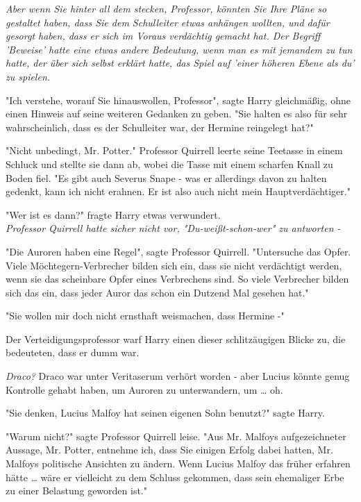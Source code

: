{\emph{Aber wenn Sie hinter all dem stecken, Professor, könnten Sie Ihre Pläne so gestaltet haben, dass Sie dem Schulleiter etwas anhängen wollten, und dafür gesorgt haben, dass er sich im Voraus verdächtig gemacht hat. Der Begriff 'Beweise' hatte eine etwas andere Bedeutung, wenn man es mit jemandem zu tun hatte, der über sich selbst erklärt hatte, das Spiel auf 'einer höheren Ebene als du' zu spielen.}

"Ich verstehe, worauf Sie hinauswollen, Professor", sagte Harry gleichmäßig, ohne einen Hinweis auf seine weiteren Gedanken zu geben. "Sie halten es also für sehr wahrscheinlich, dass es der Schulleiter war, der Hermine reingelegt hat?"

"Nicht unbedingt, Mr. Potter." Professor Quirrell leerte seine Teetasse in einem Schluck und stellte sie dann ab, wobei die Tasse mit einem scharfen Knall zu Boden fiel. "Es gibt auch Severus Snape - was er allerdings davon zu halten gedenkt, kann ich nicht erahnen. Er ist also auch nicht mein Hauptverdächtiger."

"Wer ist es dann?" fragte Harry etwas verwundert.\\ \emph{Professor Quirrell hatte sicher nicht vor, "Du-weißt-schon-wer" zu antworten -}

"Die Auroren haben eine Regel", sagte Professor Quirrell. "Untersuche das Opfer. Viele Möchtegern-Verbrecher bilden sich ein, dass sie nicht verdächtigt werden, wenn sie das scheinbare Opfer eines Verbrechens sind. So viele Verbrecher bilden sich das ein, dass jeder Auror das schon ein Dutzend Mal gesehen hat."

"Sie wollen mir doch nicht ernsthaft weismachen, dass Hermine -"

Der Verteidigungsprofessor warf Harry einen dieser schlitzäugigen Blicke zu, die bedeuteten, dass er dumm war.

\emph{Draco?} Draco war unter Veritaserum verhört worden - aber Lucius könnte genug Kontrolle gehabt haben, um Auroren zu unterwandern, um … oh.

"Sie denken, Lucius Malfoy hat seinen eigenen Sohn benutzt?" sagte Harry.

"Warum nicht?" sagte Professor Quirrell leise. "Aus Mr. Malfoys aufgezeichneter Aussage, Mr. Potter, entnehme ich, dass Sie einigen Erfolg dabei hatten, Mr. Malfoys politische Ansichten zu ändern. Wenn Lucius Malfoy das früher erfahren hätte … wäre er vielleicht zu dem Schluss gekommen, dass sein ehemaliger Erbe zu einer Belastung geworden ist."

}
